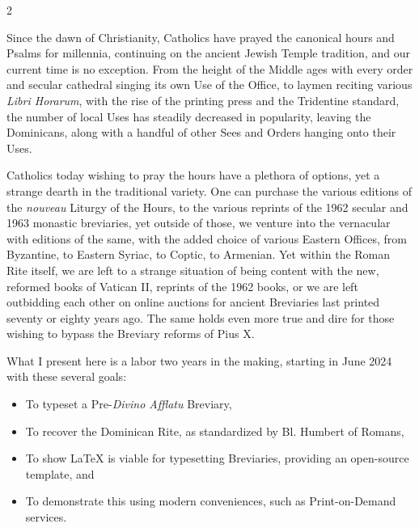 \begin{multicols*}{2}




{\color{Red} }

Since the dawn of Christianity, Catholics have prayed the canonical hours and Psalms for millennia, continuing on the ancient Jewish Temple tradition, and our current time is no exception. From the height of the Middle ages with every order and secular cathedral singing its own Use of the Office, to laymen reciting various \textit{Libri Horarum}, with the rise of the printing press and the Tridentine standard, the number of local Uses has steadily decreased in popularity, leaving the Dominicans, along with a handful of other Sees and Orders hanging onto their Uses.

Catholics today wishing to pray the hours have a plethora of options, yet a strange dearth in the traditional variety. One can purchase the various editions of the \textit{nouveau} Liturgy of the Hours, to the various reprints of the 1962 secular and 1963 monastic breviaries, yet outside of those, we venture into the vernacular with editions of the same, with the added choice of various Eastern Offices, from Byzantine, to Eastern Syriac, to Coptic, to Armenian. Yet within the Roman Rite itself, we are left to a strange situation of being content with the new, reformed books of Vatican II, reprints of the 1962 books, or we are left outbidding each other on online auctions for ancient Breviaries last printed seventy or eighty years ago. The same holds even more true and dire for those wishing to bypass the Breviary reforms of Pius X.


{\color{Red} }


What I present here is a labor two years in the making, starting in June 2024 with these several goals:
\begin{itemize}
	\item To typeset a Pre-\textit{Divino Afflatu} Breviary,
	\item To recover the Dominican Rite, as standardized by Bl. Humbert of Romans,
	\item To show LaTeX is viable for typesetting Breviaries, providing an open-source template, and
	\item To demonstrate this using modern conveniences, such as Print-on-Demand services.
\end{itemize}


\end{multicols*}
